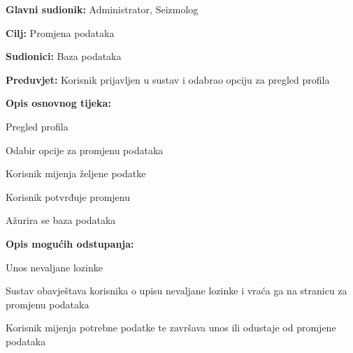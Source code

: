 					\noindent {}
					\begin{packed_item}
	
						\item \textbf{Glavni sudionik:} Administrator, Seizmolog
						\item \textbf{Cilj:} Promjena podataka
						\item \textbf{Sudionici:} Baza podataka
						\item \textbf{Preduvjet:} Korisnik prijavljen u sustav i odabrao opciju za pregled profila
						\item  \textbf{Opis osnovnog tijeka:}
						
						\item[] \begin{packed_enum}
	
							\item Pregled profila
							\item Odabir opcije za promjenu podataka
							\item Korisnik mijenja željene podatke
							\item Korisnik potvrđuje promjenu
							\item Ažurira se baza podataka
							
						\end{packed_enum}
						\item  \textbf{Opis mogućih odstupanja:}
						\item[] \begin{packed_item}
							\item[3.a] Unos nevaljane lozinke
							\item[] \begin{packed_enum}
								\item Sustav obavještava korisnika o upisu nevaljane lozinke i vraća ga na stranicu za promjenu podataka
								\item Korisnik mijenja potrebne podatke te završava unos ili odustaje od promjene podataka
							\end{packed_enum}
						\end{packed_item}
					\end{packed_item}


